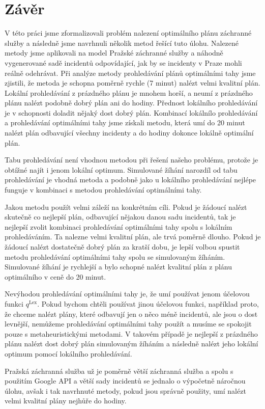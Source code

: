 \chapter*{Závěr}

V této práci jsme zformalizovali problém nalezení optimálního plánu záchranné služby a následně jsme navrhnuli několik metod řešící tuto úlohu.
Nalezené metody jsme aplikovali na model Pražské záchranné služby a náhodně vygenerované sadě incidentů odpovídající, jak by se incidenty v Praze mohli reálně odehrávat.
Při analýze metody prohledávání plánů optimálními tahy jsme zjistili, že metoda je schopna poměrně rychle (7 minut) nalézt velmi kvalitní plán.
Lokální prohledávání z prázdného plánu je mnohem horší, a neumí z prázdného plánu nalézt podobně dobrý plán ani do hodiny.
Přednost lokálního prohledávání je v schopnosti doladit nějaký dost dobrý plán.
Kombinací lokálnílo prohledávání a prohledávání optimálními tahy jsme získali metodu,
která umí do 20 minut nalézt plán odbavující všechny incidenty a do hodiny dokonce lokálně optimální plán.

Tabu prohledávání není vhodnou metodou při řešení našeho problému, protože je obtížné najít i jenom lokální optimum.
Simulované žíhání narozdíl od tabu prohledávání je vhodná metoda a podobně jako u lokálního prohledávání nejlépe funguje v kombinaci s metodou prohledávání optimálními tahy. 

Jakou metodu použít velmi záleží na konkrétním cíli.
Pokud je žádoucí nalézt skutečně co nejlepší plán, odbavující nějakou danou sadu incidentů, tak je nejlepší zvolit kombinaci prohledávání optimálními tahy spolu s lokálním prohledáváním.
Ta nalezne velmi kvalitní plán, ale trvá poměrně dlouho.
Pokud je žádoucí nalézt dostatečně dobrý plán za kratší dobu, je lepší volbou spustit metodu prohledávání optimálními tahy spolu se simulovaným žíháním.
Simulované žíhání je rychlejší a bylo schopné nalézt kvalitní plán z plánu optimálního v ceně do 20 minut.

Nevýhodou prohledávání optimálními tahy je, že umí používat jenom účelovou funkci $q^{\text{Lex}}$.
Pokud bychom chtěli používat jinou účelovou funkci, například proto, že chceme nalézt plány, které odbavují jen o něco méně incidentů, ale jsou o dost levnější,
nemůžeme prohledávání optimálními tahy použít a musíme se spokojit pouze s metaheuristickými metodami.
V takovém případě je nejlepší z prázdného plánu nalézt dost dobrý plán simulovaným žíháním a následně nalézt jeho lokální optimum pomocí lokálního prohledávání.

Pražská záchranná služba už je poměrně větší záchranná služba a spolu s použitím Google API a větší sady incidentů se jednalo o výpočetně náročnou úlohu, avšak i tak
navrhnuté metody, pokud jsou správně použity, umí nalézt velmi kvalitní plány nejhůře do hodiny.

